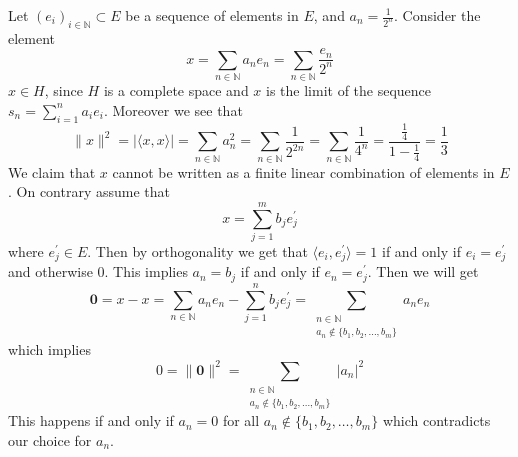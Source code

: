 \documentclass[12pt]{exam}
\theoremstyle{plain} %
\theoremstyle{definition} %
\theoremstyle{remark} %
\begin{document}
\begin{questions}
\begin{solution}
    Let $(e_i)_{ i \in \mathbb{N}} \subset E$ be a sequence of elements in $E$, and $a_n = \frac{1}{2^n}$. Consider the element \[
        x = \sum_{n \in \mathbb{N}} a_ne_n = \sum_{n \in \mathbb{N}} \frac{e_n}{2^n}
    \]
    $x \in H$, since $H$ is a complete space and $x$ is the limit of the sequence $s_n = \sum_{i = 1}^{n} a_ie_i$. Moreover we see that  \[
      \|x\|^2 = |\langle  x , x \rangle| = \sum_{n \in \mathbb{N}} a_n^2 = \sum_{n \in \mathbb{N}} \frac{1}{2^{2n}} = \sum_{n \in \mathbb{N}} \frac{1}{4^n} = \frac{\frac{1}{4}}{1- \frac{1}{4}} = \frac{1}{3}
    \]
    We claim that $x$ cannot be written as a finite linear combination of elements in $E$. On contrary assume that \[x = \sum_{j = 1}^{m} b_j e_j^\prime\]
    where $e_j^\prime \in E$. 
    Then by orthogonality we get that $\langle  e_i , e_j^\prime \rangle = 1$ if and only if $e_i = e_j^\prime$ and otherwise $0$. This implies $a_n = b_j$ if and only if $e_n = e_j^\prime$. Then we will get \[
      \textbf{0} = x - x = \sum_{n \in \mathbb{N}} a_ne_n - \sum_{j = 1}^{n} b_je_j^\prime = \sum_{\substack{n \in \mathbb{N}\\ a_n \not\in \{ b_1, b_2, \ldots , b_m \} }} a_n e_n
    \]
    which implies \[
      0 = \|\textbf{0}\|^2 = \sum_{\substack{n \in \mathbb{N} \\ a_n \notin \{ b_1, b_2, \ldots , b_m \}}} |a_n|^2
    \]
    This happens if and only if $a_n = 0$ for all $a_n \not\in \{ b_1, b_2, \ldots , b_m \}$ which contradicts our choice for $a_n$.
  \end{solution}



\end{questions}
\printbibliography[heading=bibintoc]
\end{document}
